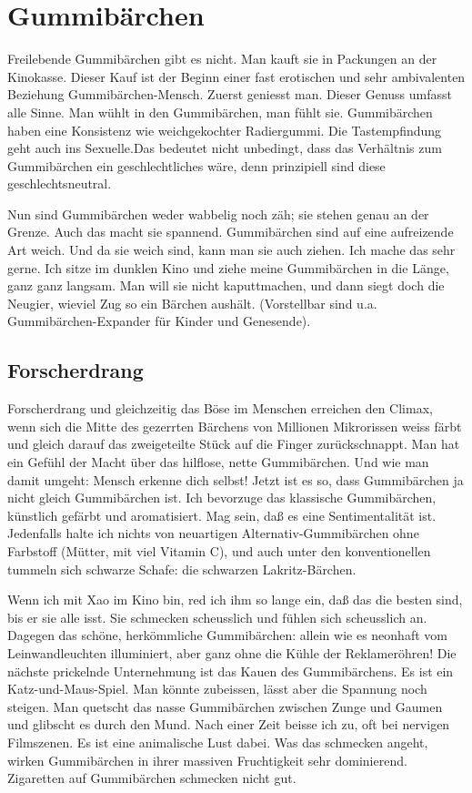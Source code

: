 
\chapter{Gummibärchen}

Freilebende Gummibärchen gibt es nicht. Man kauft sie in Packungen an der Kinokasse. Dieser Kauf ist der Beginn einer fast erotischen und sehr ambivalenten Beziehung Gummibärchen-Mensch. Zuerst geniesst man. Dieser Genuss umfasst alle Sinne. Man wühlt in den Gummibärchen, man fühlt sie. Gummibärchen haben eine Konsistenz wie weichgekochter Radiergummi. Die Tastempfindung geht auch ins Sexuelle.Das bedeutet nicht unbedingt, dass das Verhältnis zum Gummibärchen ein geschlechtliches wäre, denn prinzipiell sind diese geschlechtsneutral.

Nun sind Gummibärchen weder wabbelig noch zäh; sie stehen genau an der Grenze. Auch das macht sie spannend. Gummibärchen sind auf eine aufreizende Art weich. Und da sie weich sind, kann man sie auch ziehen. Ich mache das sehr gerne. Ich sitze im dunklen Kino und ziehe meine Gummibärchen in die Länge, ganz ganz langsam. Man will sie nicht kaputtmachen, und dann siegt doch die Neugier, wieviel Zug so ein Bärchen aushält. (Vorstellbar sind u.a. Gummibärchen-Expander für Kinder und Genesende).

\section{Forscherdrang}

Forscherdrang und gleichzeitig das Böse im Menschen erreichen den Climax, wenn sich die Mitte des gezerrten Bärchens von Millionen Mikrorissen weiss färbt und gleich darauf das zweigeteilte Stück auf die Finger zurückschnappt. Man hat ein Gefühl der Macht über das hilflose, nette Gummibärchen. Und wie man damit umgeht: Mensch erkenne dich selbst! Jetzt ist es so, dass Gummibärchen ja nicht gleich Gummibärchen ist. Ich bevorzuge das klassische Gummibärchen, künstlich gefärbt und aromatisiert. Mag sein, daß es eine Sentimentalität ist. Jedenfalls halte ich nichts von neuartigen Alternativ-Gummibärchen ohne Farbstoff (Mütter, mit viel Vitamin C), und auch unter den konventionellen tummeln sich schwarze Schafe: die schwarzen Lakritz-Bärchen.

Wenn ich mit Xao im Kino bin, red ich ihm so lange ein, daß das die besten sind, bis er sie alle isst. Sie schmecken scheusslich und fühlen sich scheusslich an. Dagegen das schöne, herkömmliche Gummibärchen: allein wie es neonhaft vom Leinwandleuchten illuminiert, aber ganz ohne die Kühle der Reklameröhren! Die nächste prickelnde Unternehmung ist das Kauen des Gummibärchens. Es ist ein Katz-und-Maus-Spiel. Man könnte zubeissen, lässt aber die Spannung noch steigen. Man quetscht das nasse Gummibärchen zwischen Zunge und Gaumen und glibscht es durch den Mund. Nach einer Zeit beisse ich zu, oft bei nervigen Filmszenen. Es ist eine animalische Lust dabei. Was das schmecken angeht, wirken Gummibärchen in ihrer massiven Fruchtigkeit sehr dominierend. Zigaretten auf Gummibärchen schmecken nicht gut.

